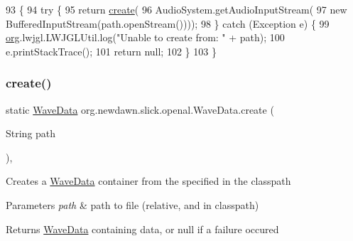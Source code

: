 \begin{DoxyCode}
93                                             \{
94         \textcolor{keywordflow}{try} \{
95             \textcolor{keywordflow}{return} \mbox{\hyperlink{classorg_1_1newdawn_1_1slick_1_1openal_1_1_wave_data_a8848866627bc92b5a94a59b800e8627c}{create}}(
96                 AudioSystem.getAudioInputStream(
97                     \textcolor{keyword}{new} BufferedInputStream(path.openStream())));
98         \} \textcolor{keywordflow}{catch} (Exception e) \{
99             \mbox{\hyperlink{namespaceorg}{org}}.lwjgl.LWJGLUtil.log(\textcolor{stringliteral}{"Unable to create from: "} + path);
100             e.printStackTrace();
101             \textcolor{keywordflow}{return} null;
102         \}       
103     \}
\end{DoxyCode}
\mbox{\label{classorg_1_1newdawn_1_1slick_1_1openal_1_1_wave_data_abb85adea7a217b24fc2e861140fc9f79}} 
\subsubsection{\texorpdfstring{create()}{create()}\hspace{0.1cm}{\footnotesize\ttfamily [2/6]}}
{\footnotesize\ttfamily static \mbox{\hyperlink{classorg_1_1newdawn_1_1slick_1_1openal_1_1_wave_data}{Wave\+Data}} org.\+newdawn.\+slick.\+openal.\+Wave\+Data.\+create (\begin{DoxyParamCaption}\item[{String}]{path }\end{DoxyParamCaption})\hspace{0.3cm}{\ttfamily [inline]}, {\ttfamily [static]}}

Creates a \mbox{\hyperlink{classorg_1_1newdawn_1_1slick_1_1openal_1_1_wave_data}{Wave\+Data}} container from the specified in the classpath


\begin{DoxyParams}{Parameters}
{\em path} & path to file (relative, and in classpath) \\
\hline
\end{DoxyParams}
\begin{DoxyReturn}{Returns}
\mbox{\hyperlink{classorg_1_1newdawn_1_1slick_1_1openal_1_1_wave_data}{Wave\+Data}} containing data, or null if a failure occured 
\end{DoxyReturn}

